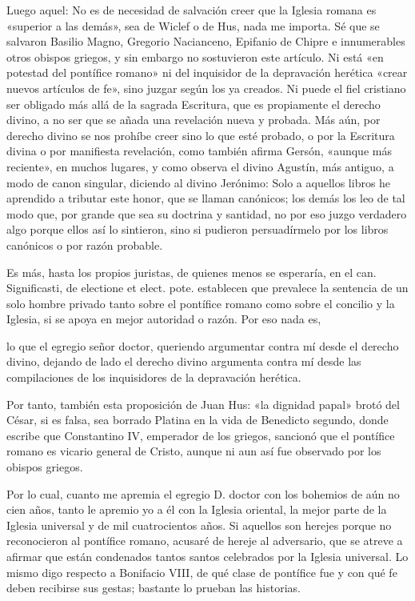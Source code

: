 Luego aquel: No es de necesidad de salvación creer que la Iglesia romana es «superior a las demás», sea de Wiclef o de Hus, nada me importa. Sé que se salvaron Basilio Magno, Gregorio Nacianceno, Epifanio de Chipre e innumerables otros obispos griegos, y sin embargo no sostuvieron este artículo. Ni está «en potestad del pontífice romano» ni del inquisidor de la depravación herética «crear nuevos artículos de fe», sino juzgar según los ya creados. Ni puede el fiel cristiano ser obligado más allá de la sagrada Escritura, que es propiamente el derecho divino, a no ser que se añada una revelación nueva y probada. Más aún, por derecho divino se nos prohíbe creer sino lo que esté probado, o por la Escritura divina o por manifiesta revelación, como también afirma Gersón, «aunque más reciente», en muchos lugares, y como observa el divino Agustín, más antiguo, a modo de canon singular, diciendo al divino Jerónimo: Solo a aquellos libros he aprendido a tributar este honor, que se llaman canónicos; los demás los leo de tal modo que, por grande que sea su doctrina y santidad, no por eso juzgo verdadero algo porque ellos así lo sintieron, sino si pudieron persuadírmelo por los libros canónicos o por razón probable.

Es más, hasta los propios juristas, de quienes menos se esperaría, en el can. Significasti, de electione et elect. pote. establecen que prevalece la sentencia de un solo hombre privado tanto sobre el pontífice romano como sobre el concilio y la Iglesia, si se apoya en mejor autoridad o razón. Por eso nada es,

lo que el egregio señor doctor, queriendo argumentar contra mí desde el derecho divino, dejando de lado el derecho divino argumenta contra mí desde las compilaciones de los inquisidores de la depravación herética.

Por tanto, también esta proposición de Juan Hus: «la dignidad papal» brotó del César, si es falsa, sea borrado Platina en la vida de Benedicto \marginpar{\small[280]} segundo, donde escribe que Constantino IV, emperador de los griegos, sancionó que el pontífice romano es vicario general de Cristo, aunque ni aun así fue observado por los obispos griegos.

Por lo cual, cuanto me apremia el egregio D. doctor con los bohemios de aún no cien años, tanto le apremio yo a él con la Iglesia oriental, la mejor parte de la Iglesia universal y de mil cuatrocientos años. Si aquellos son herejes porque no reconocieron al pontífice romano, acusaré de hereje al adversario, que se atreve a afirmar que están condenados tantos santos celebrados por la Iglesia universal. Lo mismo digo respecto a Bonifacio VIII, de qué clase de pontífice fue y con qué fe deben recibirse sus gestas; bastante lo prueban las historias.

